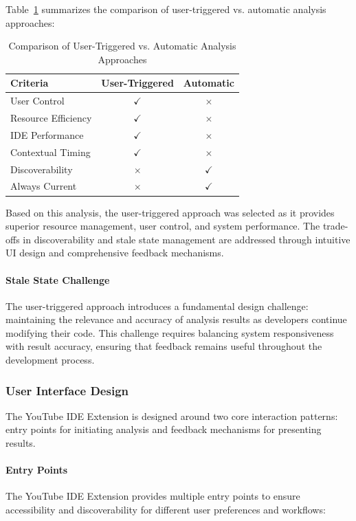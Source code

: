 \begin{spacing}{1.2}
Table~\ref{tab:analysis_approaches} summarizes the comparison of user-triggered vs. automatic analysis approaches:

\begin{table}[H]
\centering
\caption{Comparison of User-Triggered vs. Automatic Analysis Approaches}
\label{tab:analysis_approaches}
\begin{tabular}{|l|c|c|}
\hline
\textbf{Criteria} & \textbf{User-Triggered} & \textbf{Automatic} \\
\hline
User Control & $\checkmark$ & $\times$ \\
\hline
Resource Efficiency & $\checkmark$ & $\times$ \\
\hline
IDE Performance & $\checkmark$ & $\times$ \\
\hline
Contextual Timing & $\checkmark$ & $\times$ \\
\hline
Discoverability & $\times$ & $\checkmark$ \\
\hline
Always Current & $\times$ & $\checkmark$ \\
\hline
\end{tabular}
\end{table}

Based on this analysis, the user-triggered approach was selected as it provides superior resource management, user control, and system performance. The trade-offs in discoverability and stale state management are addressed through intuitive UI design and comprehensive feedback mechanisms.

\paragraph{Stale State Challenge}
The user-triggered approach introduces a fundamental design challenge: maintaining the relevance and accuracy of analysis results as developers continue modifying their code. This challenge requires balancing system responsiveness with result accuracy, ensuring that feedback remains useful throughout the development process.

\subsubsection{User Interface Design}
The YouTube IDE Extension is designed around two core interaction patterns: entry points for initiating analysis and feedback mechanisms for presenting results.

\paragraph{Entry Points}
The YouTube IDE Extension provides multiple entry points to ensure accessibility and discoverability for different user preferences and workflows:


\end{spacing}

